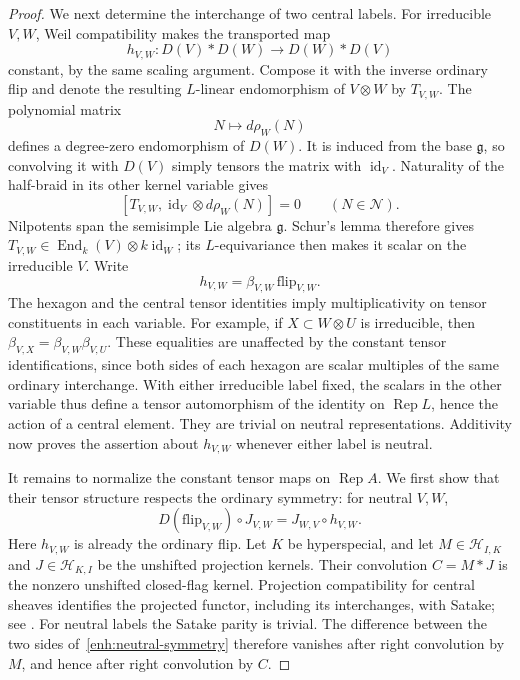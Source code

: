 \documentclass[11pt]{article}
\numberwithin{equation}{section}
\theoremstyle{definition}
\theoremstyle{remark}
\newcommand{\g}{\mathfrak g}
\newcommand{\cN}{\mathcal N}
\newcommand{\End}{\operatorname{End}}
\newcommand{\Rep}{\operatorname{Rep}}
\newcommand{\id}{\operatorname{id}}
\begin{document}
\begin{proof}
We next determine the interchange of two central labels.  For
irreducible $V,W$, Weil compatibility makes the transported map
\[
 h_{V,W}:D(V)*D(W)\longrightarrow D(W)*D(V)
\]
constant, by the same scaling argument.  Compose it with the inverse
ordinary flip and denote the resulting $L$-linear endomorphism of
$V\otimes W$ by $T_{V,W}$.
The polynomial matrix
\[
 N\longmapsto d\rho_W(N)
\]
defines a degree-zero endomorphism of $D(W)$.  It is induced from
the base $\g$, so convolving it with $D(V)$ simply tensors the
matrix with $\id_V$.  Naturality of the half-braid in its other
kernel variable gives
\[
 [T_{V,W},\id_V\otimes d\rho_W(N)]=0
 \qquad(N\in\cN).
\]
Nilpotents span the semisimple Lie algebra $\g$.  Schur's lemma
therefore gives $T_{V,W}\in\End_k(V)\otimes k\id_W$;
its $L$-equivariance then makes it scalar on the irreducible $V$.
Write
\[
 h_{V,W}=\beta_{V,W}\,\mathrm{flip}_{V,W}.
\]
The hexagon and the central tensor identities imply multiplicativity
on tensor constituents in each variable.  For example, if
$X\subset W\otimes U$ is irreducible, then
$\beta_{V,X}=\beta_{V,W}\beta_{V,U}$.
These equalities are unaffected by the constant tensor identifications,
since both sides of each hexagon are scalar multiples of the same
ordinary interchange.  With either irreducible label fixed, the
scalars in the other variable thus define a tensor automorphism of
the identity on $\Rep L$, hence the action of a central element.
They are trivial on neutral representations.  Additivity now proves
the assertion about $h_{V,W}$ whenever either label is neutral.

It remains to normalize the constant tensor maps on $\Rep A$.
We first show that their tensor structure respects the ordinary
symmetry: for neutral $V,W$,
\begin{equation}\label{enh:neutral-symmetry}
 D(\mathrm{flip}_{V,W})\circ J_{V,W}
   =J_{W,V}\circ h_{V,W}.
\end{equation}
Here $h_{V,W}$ is already the ordinary flip.
Let $K$ be hyperspecial, and let
$M\in\mathscr H_{I,K}$ and $J\in\mathscr H_{K,I}$ be the unshifted
projection kernels.  Their convolution $C=M*J$ is the nonzero
unshifted closed-flag kernel.  Projection compatibility for
central sheaves identifies the projected functor, including its
interchanges, with Satake; see
\cite[Section~2, Theorem ``Central and Wakimoto kernels'']{Parent}.
For neutral labels the Satake parity is trivial.  The difference
between the two sides of~\eqref{enh:neutral-symmetry}
therefore vanishes after right convolution by $M$, and hence after
right convolution by $C$.


\end{proof}
\end{document}
